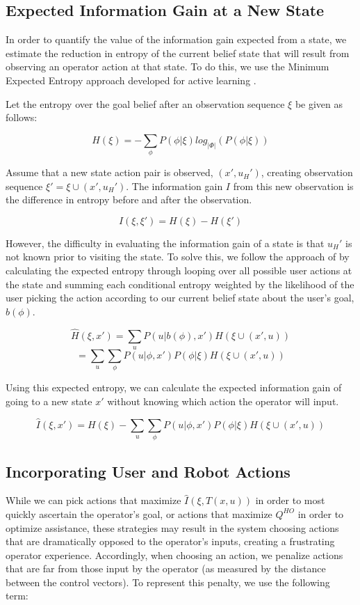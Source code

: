 \documentclass[conference]{IEEEtran}
\begin{document}
\subsection{Expected Information Gain at a New State}

In order to quantify the value of the information gain expected from a state, we estimate the reduction in entropy of the current belief state that will result from observing an operator action at that state. To do this, we use the Minimum Expected Entropy approach developed for active learning \cite{holub2008entropy}.

Let the entropy over the goal belief after an observation sequence $\xi$ be given as follows:

\[
H(\xi) = -\sum_\phi P(\phi|\xi)log_{|\Phi|}(P(\phi|\xi))
\]

Assume that a new state action pair is observed, $(x',u_H')$, creating observation sequence $\xi' = \xi \cup (x', u_H')$. The information gain $I$ from this new observation is the difference in entropy before and after the observation.

\[
I(\xi, \xi') = H(\xi) - H(\xi')
\]

However, the difficulty in evaluating the information gain of a state is that $u_H'$ is not known prior to visiting the state. To solve this, we follow the approach of \citet{holub2008entropy} by calculating the expected entropy through looping over all possible user actions at the state and summing each conditional entropy weighted by the likelihood of the user picking the action according to our current belief state about the user's goal, $b(\phi)$.

\[
\hat{H}(\xi, x') = \sum_u P(u|b(\phi),x')H(\xi \cup (x', u))
\]
\[
= \sum_u \sum_\phi P(u|\phi,x')P(\phi|\xi)H(\xi \cup (x', u))
\]

Using this expected entropy, we can calculate the expected information gain of going to a new state $x'$ without knowing which action the operator will input.

\[
\hat{I}(\xi, x') = H(\xi) - \sum_u \sum_\phi P(u|\phi,x')P(\phi|\xi)H(\xi \cup (x', u))
\]

\subsection{Incorporating User and Robot Actions}
While we can pick actions that maximize $\hat{I}(\xi, T(x,u))$ in order to most quickly ascertain the operator's goal, or actions that maximize $Q^{HO}$ in order to optimize assistance, these strategies may result in the system choosing actions that are dramatically opposed to the operator's inputs, creating a frustrating operator experience. Accordingly, when choosing an action, we penalize actions that are far from those input by the operator (as measured by the distance between the control vectors). To represent this penalty, we use the following term:
\end{document}
